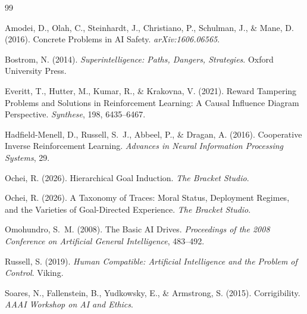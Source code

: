 \documentclass[12pt, a4paper]{article}
\begin{document}
\bigskip

\begin{thebibliography}{99}

Amodei, D., Olah, C., Steinhardt, J., Christiano, P., Schulman, J., \& Mane, D. (2016).
Concrete Problems in AI Safety.
\textit{arXiv:1606.06565}.

Bostrom, N. (2014).
\textit{Superintelligence: Paths, Dangers, Strategies}.
Oxford University Press.

Everitt, T., Hutter, M., Kumar, R., \& Krakovna, V. (2021).
Reward Tampering Problems and Solutions in Reinforcement Learning: A Causal Influence Diagram Perspective.
\textit{Synthese}, 198, 6435--6467.

Hadfield-Menell, D., Russell, S.~J., Abbeel, P., \& Dragan, A. (2016).
Cooperative Inverse Reinforcement Learning.
\textit{Advances in Neural Information Processing Systems}, 29.

Ochei, R. (2026).
Hierarchical Goal Induction.
\textit{The Bracket Studio}.

Ochei, R. (2026).
A Taxonomy of Traces: Moral Status, Deployment Regimes, and the Varieties of Goal-Directed Experience.
\textit{The Bracket Studio}.

Omohundro, S.~M. (2008).
The Basic AI Drives.
\textit{Proceedings of the 2008 Conference on Artificial General Intelligence}, 483--492.

Russell, S. (2019).
\textit{Human Compatible: Artificial Intelligence and the Problem of Control}.
Viking.

Soares, N., Fallenstein, B., Yudkowsky, E., \& Armstrong, S. (2015).
Corrigibility.
\textit{AAAI Workshop on AI and Ethics}.

\end{thebibliography}
\end{document}

